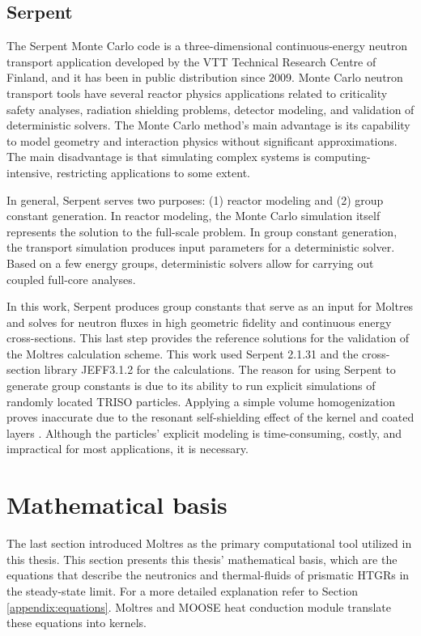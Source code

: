 \subsection{Serpent}
\label{sec:ch3-serpent}

The Serpent Monte Carlo code \cite{leppanen_development_2007} \cite{leppanen_serpent_2015} is a three-dimensional continuous-energy neutron transport application developed by the VTT Technical Research Centre of Finland, and it has been in public distribution since 2009.
Monte Carlo neutron transport tools have several reactor physics applications related to criticality safety analyses, radiation shielding problems, detector modeling, and validation of deterministic solvers.
The Monte Carlo method's main advantage is its capability to model geometry and interaction physics without significant approximations.
The main disadvantage is that simulating complex systems is computing-intensive, restricting applications to some extent.

In general, Serpent serves two purposes: (1) reactor modeling and (2) group constant generation.
In reactor modeling, the Monte Carlo simulation itself represents the solution to the full-scale problem.
In group constant generation, the transport simulation produces input parameters for a deterministic solver.
Based on a few energy groups, deterministic solvers allow for carrying out coupled full-core analyses.

In this work, Serpent produces group constants that serve as an input for Moltres and solves for neutron fluxes in high geometric fidelity and continuous energy cross-sections.
This last step provides the reference solutions for the validation of the Moltres calculation scheme.
This work used Serpent 2.1.31 and the cross-section library JEFF3.1.2 for the calculations.
The reason for using Serpent to generate group constants is due to its ability to run explicit simulations of randomly located TRISO particles.
Applying a simple volume homogenization proves inaccurate due to the resonant self-shielding effect of the kernel and coated layers \cite{strydom_results_2015}.
Although the particles' explicit modeling is time-consuming, costly, and impractical for most applications, it is necessary.

\section{Mathematical basis}
\label{sec:ch3-math}

The last section introduced Moltres as the primary computational tool utilized in this thesis.
This section presents this thesis' mathematical basis, which are the equations that describe the neutronics and thermal-fluids of prismatic HTGRs in the steady-state limit.
For a more detailed explanation refer to Section \ref{appendix:equations}.
Moltres and MOOSE heat conduction module translate these equations into kernels.

